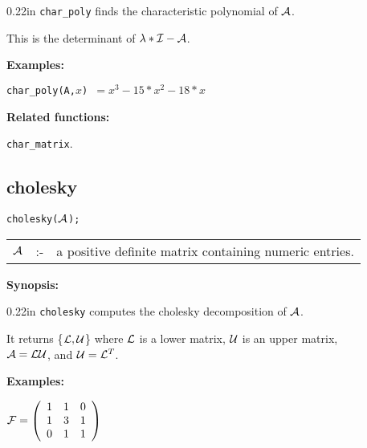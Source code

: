 \begin{addtolength}{\leftskip}{0.22in}
{\tt char\_poly} finds the characteristic polynomial of
                ${\cal A}$.

This is the determinant of $\lambda * {\cal I} - {\cal A}$.

\end{addtolength}

{\bf Examples:}

\hspace*{0.175in}
{\tt char\_poly({\cal A},$x$) $= x^3-15*x^2-18*x$}

{\bf Related functions:}

\hspace*{0.175in} {\tt char\_matrix}.


\subsection{cholesky}


\hspace*{0.175in} {\tt cholesky(${\cal A}$);}

\hspace*{0.1in}
\begin{tabular}{l l l}
${\cal A}$ &:-& a positive definite matrix containing numeric entries.
\end{tabular}

{\bf Synopsis:} %

\begin{addtolength}{\leftskip}{0.22in}
{\tt cholesky} computes the cholesky decomposition of ${\cal A}$.

It returns \{${\cal L,U}$\} where ${\cal L}$
is a lower matrix, ${\cal U}$ is an upper matrix, \\ ${\cal A} =
{\cal LU}$, and ${\cal U} = {\cal L}^T$.

\end{addtolength}

{\bf Examples:}

\begin{flushleft}
\hspace*{0.175in}
\begin{math}
{\cal F} = \left( \begin{array}{ccc} 1 & 1 & 0 \\ 1 & 3 & 1 \\ 0 & 1 &
1
\end{array} \right)
\end{math}
\end{flushleft}

